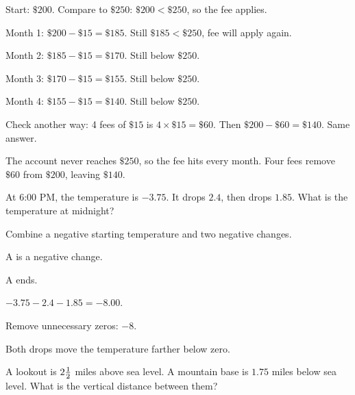 \begin{steps}
  \item Start: $\$200$. Compare to $\$250$: $\$200 < \$250$, so the fee applies.
  \item Month 1: $\$200 - \$15 = \$185$. Still $\$185 < \$250$, fee will apply again.
  \item Month 2: $\$185 - \$15 = \$170$. Still below $\$250$.
  \item Month 3: $\$170 - \$15 = \$155$. Still below $\$250$.
  \item Month 4: $\$155 - \$15 = \$140$. Still below $\$250$.
  \item Check another way: 4 fees of $\$15$ is $4 \times \$15 = \$60$. Then $\$200 - \$60 = \$140$. Same answer.
\end{steps}


The account never reaches $\$250$, so the fee hits every month. Four fees remove $\$60$ from $\$200$, leaving $\$140$.


At 6:00 PM, the temperature is $-3.75$\degC. It drops $2.4$\degC, then drops $1.85$\degC. What is the temperature at midnight?


Combine a negative starting temperature and two negative changes.

\begin{words}
  \item A is a negative change.
  \item A ends.
\end{words}

\begin{steps}
  \item $-3.75 - 2.4 - 1.85 = -8.00$.
  \item Remove unnecessary zeros: $-8$.
\end{steps}


Both drops move the temperature farther below zero.


A lookout is $2\tfrac{1}{2}$ miles above sea level. A mountain base is $1.75$ miles below sea level. What is the vertical distance between them?

